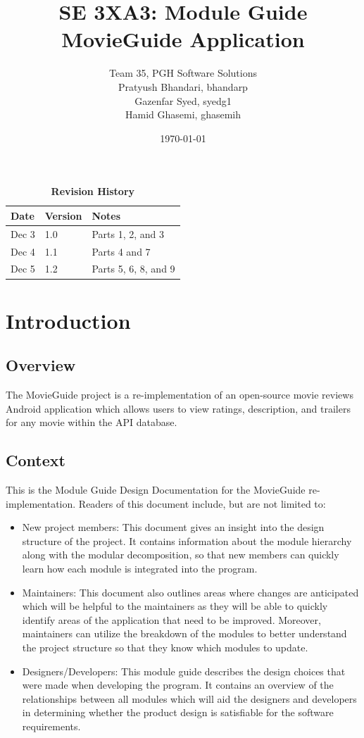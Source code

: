 \documentclass[12pt, titlepage]{article}
\title{SE 3XA3: Module Guide\\MovieGuide Application}
\author{Team 35, PGH Software Solutions
		\\ Pratyush Bhandari, bhandarp
		\\ Gazenfar Syed, syedg1
		\\ Hamid Ghasemi, ghasemih
}
\date{\today}
\begin{document}
\maketitle

\tableofcontents

\newpage

\listoftables
\listoffigures

\begin{table}[bp]
\caption{\bf Revision History}
\begin{tabularx}{\textwidth}{p{3cm}p{2cm}X}
\toprule {\bf Date} & {\bf Version} & {\bf Notes}\\
\midrule
Dec 3 & 1.0 & Parts 1, 2, and 3\\
Dec 4 & 1.1 & Parts 4 and 7\\
Dec 5 & 1.2 & Parts 5, 6, 8, and 9\\
\bottomrule
\end{tabularx}
\end{table}


 
\newpage
\section{Introduction}

\subsection{Overview}
The MovieGuide project is a re-implementation of an open-source movie reviews Android application which allows users to view ratings, description, and trailers for any movie within the API database.

\subsection{Context}
This is the Module Guide Design Documentation for the MovieGuide re-implementation. Readers of this document include, but are not limited to:

\begin{itemize}
	\item New project members: This document gives an insight into the design structure of the project. It contains information about the module hierarchy along with the modular decomposition, so that new members can quickly learn how each module is integrated into the program.
	\item Maintainers: This document also outlines areas where changes are anticipated which will be helpful to the maintainers as they will be able to quickly identify areas of the application that need to be improved. Moreover, maintainers can utilize the breakdown of the modules to better understand the project structure so that they know which modules to update.
	\item Designers/Developers: This module guide describes the design choices that were made when developing the program. It contains an overview of the relationships between all modules which will aid the designers and developers in determining whether the product design is satisfiable for the software requirements.
\end{itemize}
\end{document}
